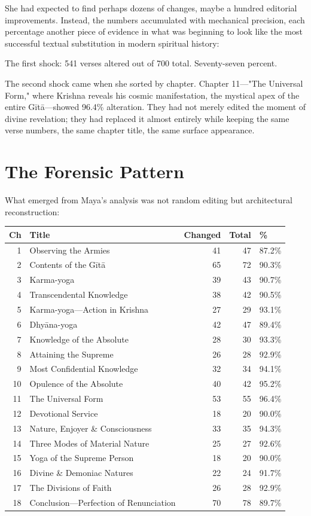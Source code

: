 \documentclass[11pt,twoside]{book}
\begin{document}
She had expected to find perhaps dozens of changes, maybe a hundred editorial improvements. Instead, the numbers accumulated with mechanical precision, each percentage another piece of evidence in what was beginning to look like the most successful textual substitution in modern spiritual history:

The first shock: 541 verses altered out of 700 total. Seventy-seven percent.

The second shock came when she sorted by chapter. Chapter 11—"The Universal Form," where Krishna reveals his cosmic manifestation, the mystical apex of the entire Gītā—showed 96.4\% alteration. They had not merely edited the moment of divine revelation; they had replaced it almost entirely while keeping the same verse numbers, the same chapter title, the same surface appearance.
\section*{The Forensic Pattern}
\label{sec:org3444ba1}

What emerged from Maya's analysis was not random editing but architectural reconstruction:

\small
\begin{center}
\begin{tabular}{rlrrl}
Ch & Title & Changed & Total & \%\\
\hline
1 & Observing the Armies & 41 & 47 & 87.2\%\\
2 & Contents of the Gītā & 65 & 72 & 90.3\%\\
3 & Karma-yoga & 39 & 43 & 90.7\%\\
4 & Transcendental Knowledge & 38 & 42 & 90.5\%\\
5 & Karma-yoga—Action in Krishna & 27 & 29 & 93.1\%\\
6 & Dhyāna-yoga & 42 & 47 & 89.4\%\\
7 & Knowledge of the Absolute & 28 & 30 & 93.3\%\\
8 & Attaining the Supreme & 26 & 28 & 92.9\%\\
9 & Most Confidential Knowledge & 32 & 34 & 94.1\%\\
10 & Opulence of the Absolute & 40 & 42 & 95.2\%\\
11 & The Universal Form & 53 & 55 & 96.4\%\\
12 & Devotional Service & 18 & 20 & 90.0\%\\
13 & Nature, Enjoyer \& Consciousness & 33 & 35 & 94.3\%\\
14 & Three Modes of Material Nature & 25 & 27 & 92.6\%\\
15 & Yoga of the Supreme Person & 18 & 20 & 90.0\%\\
16 & Divine \& Demoniac Natures & 22 & 24 & 91.7\%\\
17 & The Divisions of Faith & 26 & 28 & 92.9\%\\
18 & Conclusion—Perfection of Renunciation & 70 & 78 & 89.7\%\\
\end{tabular}
\end{center}
\normalsize
\end{document}
